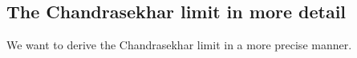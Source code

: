 \documentclass[main.tex]{subfiles}
\begin{document}


\subsection{The Chandrasekhar limit in more detail}

We want to derive the Chandrasekhar limit in a more precise manner. 

%
%
%
%
%
\end{document}
